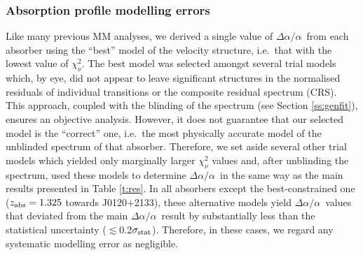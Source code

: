 \documentclass[fleqn,usenatbib,usedcolumn]{mnras}
\renewcommand{\la}{\lesssim} %
\newcommand{\Sref}[1]{Section \ref{#1}}
\newcommand{\Tref}[1]{Table \ref{#1}}
\newcommand{\zab}{\ensuremath{z_\textrm{\scriptsize abs}}}
\newcommand{\daa}{\ensuremath{\Delta\alpha/\alpha}}
\begin{document}
\subsubsection{Absorption profile modelling errors}\label{sss:moderr}

Like many previous MM analyses, we derived a single value of \daa\ from each absorber using the ``best'' model of the velocity structure, i.e.\ that with the lowest value of $\chi^2_\nu$. The best model was selected amongst several trial models which, by eye, did not appear to leave significant structures in the normalised residuals of individual transitions or the composite residual spectrum (CRS). This approach, coupled with the blinding of the spectrum (see \Sref{ss:genfit}), ensures an objective analysis. However, it does not guarantee that our selected model is the ``correct'' one, i.e.\ the most physically accurate model of the unblinded spectrum of that absorber. Therefore, we set aside several other trial models which yielded only marginally larger $\chi^2_\nu$ values and, after unblinding the spectrum, used these models to determine \daa\ in the same way as the main results presented in \Tref{t:res}. In all absorbers except the best-constrained one ($\zab=1.325$ towards J0120$+$2133), these alternative models yield \daa\ values that deviated from the main \daa\ result by substantially less than the statistical uncertainty ($\la$0.2$\sigma_{\rm stat}$). Therefore, in these cases, we regard any systematic modelling error as negligible.
\end{document}

